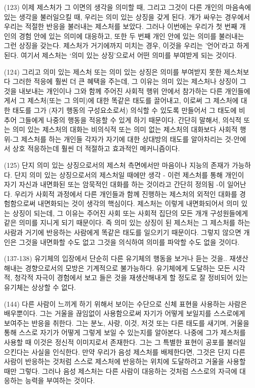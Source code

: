 \documentclass[12pt, a4paper]{article}
\begin{document}
(123) 이제 제스처가 그 이면의 생각을 의미할 때, 그리고 그것이 다른 개인의 마음속에 있는 생각을 불러일으킬 때, 우리는 의미 있는 상징을 갖게 된다. 개가 싸우는 경우에서 우리는 적절한 반응을 불러내는 제스처를 보았다. 그러나 이번에는 우리가 첫 번째 개인의 경험 안에 있는 의미에 대응하고, 또한 두 번째 개인 안에 있는 의미를 불러내는 그런 상징을 갖는다. 제스처가 거기에까지 미치는 경우, 이것을 우리는 '언어'라고 하게 된다. 여기서 제스처는 `의미 있는 상징'으로서 어떤 의미를 부여받게 되는 것이다.

(124) 그리고 의미 있는 제스처 또는 의미 있는 상징은 의미를 부여받지 못한 제스처보다 그러한 적응에 훨씬 더 큰 혜택을 주는데, 그 이유는 의미 있는 제스처나 상징이 그것을 내보내는 개인이나 그와 함께 주어진 사회적 행위 안에서 참가하는 다른 개인들에게서 그 제스처(또는 그 의미)에 대한 똑같은 태도를 끌어내고, 이로써 그 제스처에 대한 태도를 그가 (자기 행동의 구성요소로서) 의식할 수 있도록 만들어서 그 태도에 비추어 그들에게 나중의 행동을 적응할 수 있게 하기 때문이다. 간단히 말해서, 의식적 또는 의미 있는 제스처의 대화는 비의식적 또는 의미 없는 제스처의 대화보다 사회적 행위-그 제스처를 하는 개인들 각자가 자기에 대한 상대방의 태도를 알아차리는 것-안에서 상호 적응하는데 훨씬 더 적절하고 효과적인 메커니즘이다.

(125) 단지 의미 있는 상징으로서의 제스처 측면에서만 마음이나 지능의 존재가 가능하다. 단지 의미 있는 상징으로서의 제스처일 때에만 생각 - 이런 제스처를 통해 개인이 자기 자신과 내면화된 또는 암묵적인 대화를 하는 것이라고 간단히 정의됨 -이 일어난다. 우리가 사회적 과정에서 다른 개인들과 함께 진행하는 제스처의 외적인 대화를 경험함으로써 내면화되는 것이 생각의 핵심이다. 제스처는 이렇게 내면화되어서 의미 있는 상징이 되는데, 그 이유는 주어진 사회 또는 사회적 집단의 모든 개개 구성원들에게 같은 의미를 지니게 되기 때문이다. 즉 의미 있는 상징이 된 제스처는 그 제스처를 하는 사람과 거기에 반응하는 사람에게 똑같은 태도를 일으키기 때문이다. 그렇지 않으면 개인은 그것을 내면화할 수도 없고 그것을 의식하여 의미를 파악할 수도 없을 것이다.

(137-138) 유기체의 입장에서 단순히 다른 유기체의 행동을 보거나 듣는 것을.. 재생산해내는 경향으로서의 모방은 기계적으로 불가능하다. 유기체에게 도달하는 모든 시각적, 청각적 자극이 경험에서 보고 들은 것을 재생산해내게 할 정도로 잘 정비되어 있는 유기체는 상상할 수 없다.

(144) 다른 사람이 느끼게 하기 위해서 보이는 수단으로 신체 표현을 사용하는 사람은 배우뿐이다. 그는 거울을 끊임없이 사용함으로써 자기가 어떻게 보일지를 스스로에게 보여주는 반응을 취한다. 그는 분노, 사랑, 이것, 저것 또는 다른 태도를 새기며, 거울을 통해 스스로 자기가 어떻게 그렇게 보일 수 있는지를 알아본다. 나중에 그가 제스처를 사용할 때 이것은 정신적 이미지로서 존재한다. 그는 그 특별한 표현이 공포를 불러일으킨다는 사실을 인식한다. 만약 우리가 음성 제스처를 배제한다면, 그것은 단지 다른 사람이 반응하는 것처럼 스스로 제스처에 반응하는 위치에 도달하려고 거울을 사용할 때만 그렇다. 그러나 음성 제스처는 다른 사람이 대응하는 것처럼 스스로의 자극에 대응하는 능력을 부여하는 것이다. 
\end{document}
